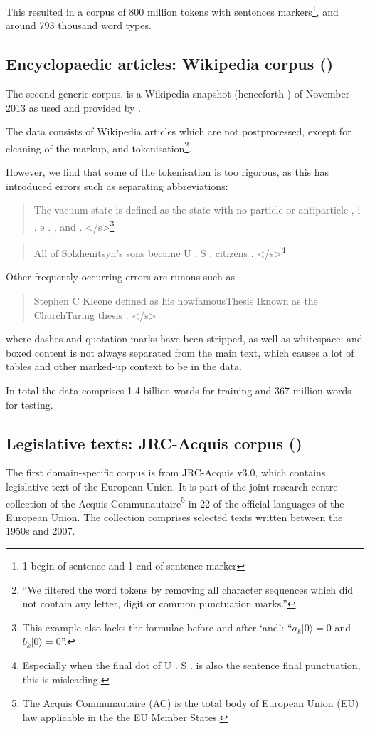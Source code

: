   This resulted in a corpus of 800 million tokens with sentences markers\footnote{1 begin of sentence and 1 end of sentence marker}, and around 793 thousand word types.
  
 \subsection{Encyclopaedic articles: Wikipedia corpus (\wp)}
  The second generic corpus, is a Wikipedia snapshot (henceforth \wp) of November 2013 as used and provided by \textcite{pickhardt2014generalized}. 
  
  The data consists of Wikipedia articles which are not postprocessed, except for cleaning of the markup, and tokenisation\footnote{``We filtered the word tokens by removing all character sequences which did not contain any letter, digit or common punctuation marks.''}.
  
  However, we find that some of the tokenisation is too rigorous, as this has introduced errors such as separating abbreviations:
  
  \begin{quote}The vacuum state is defined as the state with no particle or antiparticle , i . e . , and . </s>\footnote{This example also lacks the formulae before and after `and': ``$a_k |0\rangle=0$ and $b_k |0\rangle=0$''.}\end{quote}
  
  \begin{quote}All of Solzhenitsyn's sons became U . S . citizens . </s>\footnote{Especially when the final dot of U . S . is also the sentence final punctuation, this is misleading.}\end{quote}
  Other frequently occurring errors are runons such as 
  
  \begin{quote}Stephen C Kleene defined as his nowfamousThesis Iknown as the ChurchTuring thesis . </s>\end{quote}
  where dashes and quotation marks have been stripped, as well as whitespace; and boxed content is not always separated from the main text, which causes a lot of tables and other marked-up context to be in the data.
  
  In total the data comprises 1.4 billion words for training and 367 million words for testing.

   \subsection{Legislative texts: JRC-Acquis corpus (\jrc)}
  The first domain-specific corpus is from JRC-Acquis v3.0\autocite{steinberger2006jrc}, which contains legislative text of the European Union. It is part of the joint research centre collection of the Acquis Communautaire\footnote{The Acquis Communautaire (AC) is the total body of European Union (EU) law applicable in the the EU Member States.} in 22 of the official languages of the European Union. The collection comprises selected texts written between the 1950s and 2007.
  
